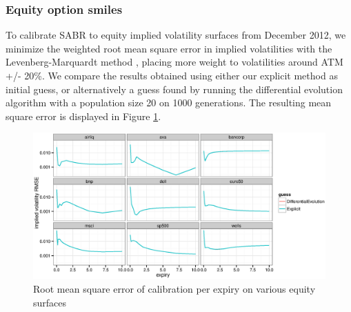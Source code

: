 \documentclass[]{rAMF2e}
\begin{document}
\subsubsection{Equity option smiles}
To calibrate SABR to equity implied volatility surfaces from December 2012, we minimize the weighted root mean square error in implied volatilities with the Levenberg-Marquardt method \citep{levenberg1944method,marquardt1963algorithm}, placing more weight to volatilities around ATM +/- 20\%. We compare the results obtained using either our explicit method as initial guess, or alternatively a guess found by running the differential evolution algorithm \citep{storn1997differential} with a population size 20 on 1000 generations. The resulting mean square error is displayed in Figure \ref{fig:explicit_de_equity_error}.

\begin{figure}[!h]
  \caption{\label{fig:explicit_de_equity_error}Root mean square error of calibration per expiry on various equity surfaces}
\begin{center}
 \includegraphics[width=16cm]{explicit_de_equity_error.eps}
\end{center}
\end{figure}
\end{document}
